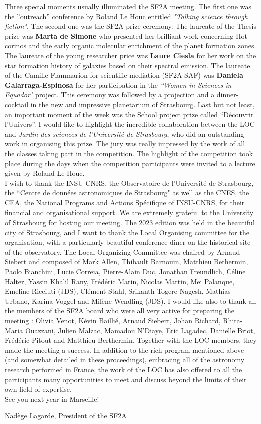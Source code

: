 Three special moments usually illuminated the SF2A meeting. The first one was the ”outreach” conference by Roland Le Houc entitled \textit{"Talking science through fiction"}. The second one was the SF2A prize ceremony. The laureate of the Thesis prize was \textbf{Marta de Simone} who presented her brilliant work concerning Hot corinos and the early organic molecular enrichment of the planet formation zones. The laureate of the young researcher price was \textbf{Laure Ciesla} for her work on the star formation history of galaxies based on their spectral emission. The laureate of the Camille Flammarion for scientific mediation (SF2A-SAF) was \textbf{Daniela Galarraga-Espinosa} for her participation in the \textit{``Women in Sciences in Equador"} project. This ceremony was followed by a projection and a dinner-cocktail in the new and impressive planetarium of Strasbourg. Last but not least, an important moment of the week was the School project prize called ``Découvrir l’Univers”. I would like to highlight the incredible collaboration between the LOC and \textit{Jardin des sciences de l'Université de Strasbourg}, who did an outstanding work in organising this prize. The jury was really impressed by the work of all the classes taking part in the competition. The highlight of the competition took place during the days when the competition participants were invited to a lecture given by Roland Le Houc. \\

I wish to thank the INSU-CNRS, the Observatoire de l'Université de Strasbourg, the ``Centre de données astronomiques de Strasbourg" as well as the CNES, the CEA, the National Programs and Actions Spécifique of INSU-CNRS, for their financial and organisational support. We are extremely grateful to the University of Strasbourg for hosting our meeting. The 2023 edition was held in the beautiful city of Strasbourg, and I want to thank the Local Organising committee for the organisation, with a particularly beautiful conference diner on the historical site of the observatory. The Local Organizing Committee was chaired by Arnaud Siebert and composed of Mark Allen, Thibault Barnouin, Matthieu Bethermin, Paolo Bianchini,  Lucie Correia, Pierre-Alain Duc, Jonathan Freundlich, Céline Halter, Yassin Khalil Rany, Frédéric Marin, Nicolas Martin, Mei Palanque, Emeline Ricciuti (JDS), Clément Stahl, Srikanth Togere Nagesh,  Mathias Urbano,  Karina Voggel and Milène Wendling (JDS). I would like also to thank all the members of the SF2A board who were all very active for preparing the meeting : Olivia Venot, Kévin Baillié, Arnaud Siebert, Johan Richard, Rhita-Maria Ouazzani, Julien Malzac, Mamadou N'Diaye, Eric Lagadec, Danielle Briot, Frédéric Pitout and Matthieu Berthermin.  
Together with the LOC members, they made the meeting a success. In addition to the rich program mentioned above (and somewhat detailed in these proceedings), embracing all of the astronomy research performed in France, the work of the LOC has also offered to all the participants many opportunities to meet and discuss beyond the limits of their own field of expertise.\\

See you next year in Marseille!


\begin{center}
Nadège Lagarde, 
President of the SF2A 
\end{center}


%
